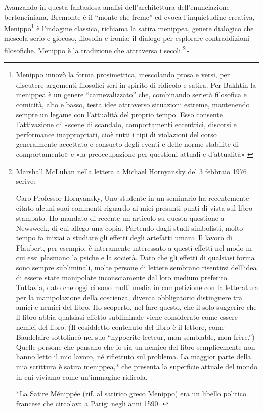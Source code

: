Avanzando in questa fantasiosa analisi dell'architettura dell'enunciazione
bertonciniana, Bremonte è il “monte che freme” ed evoca l'inquietudine creativa,
Menippo\footnote{%
  Menippo innovò la forma prosimetrica, mescolando prosa e versi,
  per discutere argomenti filosofici seri in spirito di ridicolo e satira. Per
  Bakhtin la menippea è un genere “carnevalizzato” che, combinando serietà
  filosofica e comicità, alto e basso, testa idee attraverso situazioni
  estreme, mantenendo sempre un legame con l'attualità del proprio tempo. Esso
  consente l'attivazione di «scene di scandalo, comportamenti eccentrici,
  discorsi e performance inappropriati, cioè tutti i tipi di violazioni del
  corso generalmente accettato e consueto degli eventi e delle norme stabilite
  di comportamento» e «la preoccupazione per questioni attuali e d'attualità» \cite{bakhtin84}
}%
è l'indagine classica, richiama la satira menippea, genere dialogico che mescola
serio e giocoso, filosofia e ironia: il dialogo per esplorare contraddizioni
filosofiche. Menippo è la tradizione che attraversa i secoli.\footnote{%
  Marshall McLuhan nella lettera a Michael Hornyansky del 3 febbraio 1976
  scrive:

  Caro Professor Hornyansky,
  Uno studente in un seminario ha recentemente citato alcuni suoi commenti
  riguardo ai miei presunti punti di vista sul libro stampato. Ho mandato di
  recente un articolo su questa questione a Newsweek, di cui allego una copia.
  Partendo dagli studi simbolisti, molto tempo fa iniziai a studiare gli effetti
  degli artefatti umani. Il lavoro di Flaubert, per esempio, è interamente
  interessato a questi effetti nel modo in cui essi plasmano la psiche e la
  società. Dato che gli effetti di qualsiasi forma sono sempre subliminali,
  molte persone di lettere sembrano risentirsi dell'idea di essere state
  manipolate inconsciamente dal loro medium preferito. Tuttavia, dato che oggi
  ci sono molti media in competizione con la letteratura per la manipolazione
  della coscienza, diventa obbligatorio distinguere tra amici e nemici del
  libro. Ho scoperto, nel fare questo, che il solo suggerire che il libro abbia
  qualsiasi effetto subliminale viene considerato come essere nemici del libro.
  (Il cosiddetto contenuto del libro è il lettore, come Baudelaire sottolineò
  nel suo “hypocrite lecteur, mon semblable, mon frère.”) Quelle persone che
  pensano che io sia un nemico del libro semplicemente non hanno letto il mio
  lavoro, né riflettuto sul problema. La maggior parte della mia scrittura è
  satira menippea,* che presenta la superficie attuale del mondo in cui viviamo
  come un'immagine ridicola.

  *La Satire Ménippée (rif. al satirico greco Menippo) era un libello politico
  francese che circolava a Parigi negli anni 1590. \cite{mcluhan87}
}»

